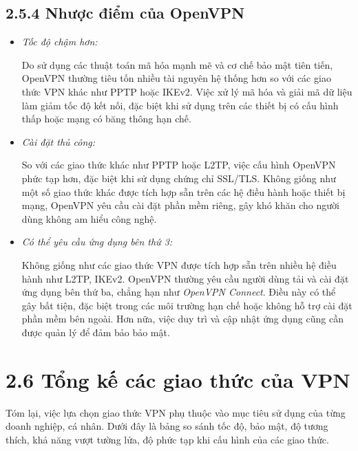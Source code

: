 \subsection*{2.5.4 Nhược điểm của OpenVPN}

\begin{itemize}
        \item \textit{Tốc độ chậm hơn:}
        
         Do sử dụng các thuật toán mã hóa mạnh mẽ và cơ chế bảo mật tiên tiến, OpenVPN thường tiêu tốn nhiều tài nguyên hệ thống hơn so với các giao thức VPN khác như PPTP hoặc IKEv2. Việc xử lý mã hóa và giải mã dữ liệu làm giảm tốc độ kết nối, đặc biệt khi sử dụng trên các thiết bị có cấu hình thấp hoặc mạng có băng thông hạn chế.
        \item \textit{Cài đặt thủ công:}

       So với các giao thức khác như PPTP hoặc L2TP, việc cấu hình OpenVPN phức tạp hơn, đặc biệt khi sử dụng chứng chỉ SSL/TLS. Không giống như một số giao thức khác được tích hợp sẵn trên các hệ điều hành hoặc thiết bị mạng, OpenVPN yêu cầu cài đặt phần mềm riêng, gây khó khăn cho người dùng không am hiểu công nghệ.

       
        \item \textit{Có thể yêu cầu ứng dụng bên thứ 3:}

        Không giống như các giao thức VPN được tích hợp sẵn trên nhiều hệ điều hành như L2TP, IKEv2. OpenVPN thường yêu cầu người dùng tải và cài đặt ứng dụng bên thứ ba, chẳng hạn như \textit{OpenVPN Connect}. Điều này có thể gây bất tiện, đặc biệt trong các môi trường hạn chế hoặc không hỗ trợ cài đặt phần mềm bên ngoài. Hơn nữa, việc duy trì và cập nhật ứng dụng cũng cần được quản lý để đảm bảo bảo mật.
    \end{itemize} 

 \section*{2.6 Tổng kế các giao thức của VPN}

 Tóm lại, việc lựa chọn giao thức VPN phụ thuộc vào mục tiêu sử dụng của từng doanh nghiệp, cá nhân. Dưới đây là bảng so sánh tốc độ, bảo mật, độ tương thích, khả năng vượt tường lửa, độ phức tạp khi cấu hình của các giao thức. \newpage


